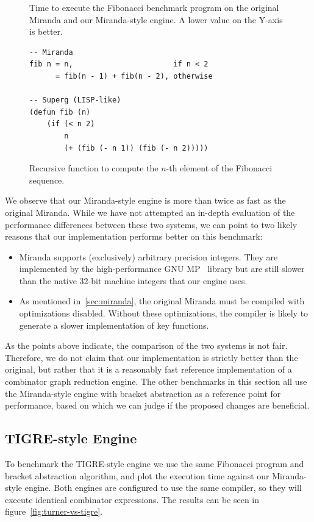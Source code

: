 \documentclass[conference]{IEEEtran}
\begin{document}
\begin{figure}
    
    \centering
    \caption{
        Time to execute the Fibonacci benchmark program on the original Miranda and our Miranda-style engine.
        A lower value on the Y-axis is better.}
    \label{fig:turner-vs-miranda}
\end{figure}

\begin{figure}
    \begin{lstlisting}
-- Miranda
fib n = n,                       if n < 2
      = fib(n - 1) + fib(n - 2), otherwise

-- Superg (LISP-like)
(defun fib (n)
    (if (< n 2) 
        n
        (+ (fib (- n 1)) (fib (- n 2)))))
    \end{lstlisting}
    \centering
    \caption{
        Recursive function to compute the $n$-th element of the Fibonacci sequence.
    }
    \label{fig:fib}
\end{figure}

We observe that our Miranda-style engine is more than twice as fast as the original Miranda.
While we have not attempted an in-depth evaluation of the performance differences between these two systems, we can point to two likely reasons that our implementation performs better on this benchmark:
\begin{itemize}
    \item Miranda supports (exclusively) arbitrary precision integers.
          They are implemented by the high-performance GNU MP~\cite{gnump} library but are still slower than the native 32-bit machine integers that our engine uses.
    \item As mentioned in~\ref{sec:miranda}, the original Miranda must be compiled with optimizations disabled.
          Without these optimizations, the compiler is likely to generate a slower implementation of key functions.
\end{itemize}

As the points above indicate, the comparison of the two systems is not fair.
Therefore, we do not claim that our implementation is strictly better than the original, but rather that it is a reasonably fast reference implementation of a combinator graph reduction engine.
The other benchmarks in this section all use the Miranda-style engine with bracket abstraction as a reference point for performance, based on which we can judge if the proposed changes are beneficial.

\subsection{TIGRE-style Engine}
To benchmark the TIGRE-style engine we use the same Fibonacci program and bracket abstraction algorithm, and plot the execution time against our Miranda-style engine.
Both engines are configured to use the same compiler, so they will execute identical combinator expressions.
The results can be seen in figure~\ref{fig:turner-vs-tigre}.
\end{document}

